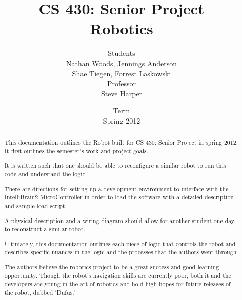 \begin{titlepage}
\pagestyle{plain}
\lhead{}
\rhead{}
\title{CS 430: Senior Project\\Robotics}
\author{\small{Students}\\
Nathan Woods,  Jennings Anderson \\Shae Tiegen,  Forrest Laskowski\\[2mm]
\small{Professor}\\
Steve Harper}
\date{\small{Term}\\
Spring 2012}
\maketitle

\begin{abstract}
This documentation outlines the Robot built for CS 430: Senior Project in spring 2012.  It first outlines the semester's work and project goals.

It is written such that one should be able to reconfigure a similar robot to run this code and understand the logic.

There are directions for setting up a development environment to interface with the IntelliBrain2 MicroController in order to load the software with a detailed description and sample load script.

A physical description and a wiring diagram should allow for another student one day to reconstruct a similar robot.

Ultimately, this documentation outlines each piece of logic that controls the robot and describes specific nuances in the logic and the processes that the authors went through.

The authors believe the robotics project to be a great success and good learning opportunity.  Though the robot's navigation skills are currently poor, both it and the developers are young in the art of robotics and hold high hopes for future releases of the robot, dubbed `Dufus.'

\end{abstract}
\end{titlepage}

\newpage
\setcounter{page}{1}
\pagestyle{fancyplain}
\cfoot{\small{\thepage}}
\clearpage


\pagestyle{fancyplain}
\cfoot{\small{\thepage}}
\singlespace
\tableofcontents

\clearpage